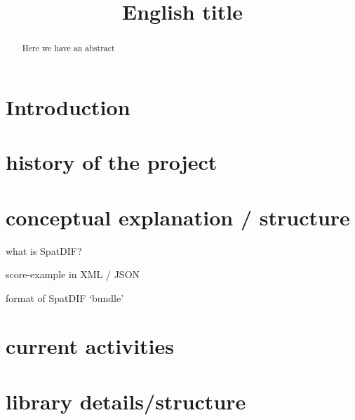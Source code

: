 \documentclass{article}
\title{English title}
\begin{document}
%

\makeatletter 
\def\ps@myheadings{%
\let\ps@jpl@in\ps@plain%
\def\@evenhead{\reset@font\hfil\leftmark\hfil}%
\def\@oddhead{\reset@font\hfil\rightmark\hfil}%
\let\@mkboth\@gobbletwo%
\let\sectionmark\@gobble%
\let\subsectionmark\@gobble%
% 
\def\@oddfoot{\reset@font\hfil-- \thepage --\hfil}%
\let\@evenfoot\@oddfoot 
} 
\makeatother 
\setcounter{page}{17} 
\pagestyle{myheadings} 
\maketitle
\thispagestyle{myheadings}

\begin{abstract}

Here we have an abstract

\end{abstract}

\section{Introduction}


\section{history of the project} %

\section{conceptual explanation / structure} %

what is SpatDIF?

score-example in XML / JSON

format of SpatDIF `bundle'

\section{current activities} %

\section{library details/structure} %
\end{document}
